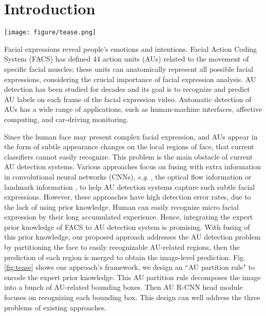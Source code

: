 \documentclass[5p,twocolumn]{elsarticle}
\newcommand{\eg}{\textit{e}.\textit{g}. }
\begin{document}
\section{Introduction}
\begin{figure*}[htbp]
	\texttt{[image: figure/tease.png]}
	\caption{The overall of AU R-CNN framework. It recognizes each RoI-level's label based on the AU partition rule, which uses the landmark point location information to encode the expert prior knowledge. This rule indicates the place where the AUs may occur. AU R-CNN head module focuses on recognizing each bounding box to improve performance.}
	\label{fig:tease}
\end{figure*}
Facial expressions reveal people's emotions and intentions. Facial Action Coding System (FACS) \cite{ekman1977facial} has defined 44 action units (AUs) related to the movement of specific facial muscles; these units can anatomically represent all possible facial expressions, considering the crucial importance of facial expression analysis. AU detection has been studied for decades and its goal is to recognize and predict AU labels on each frame of the facial expression video. Automatic detection of AUs has a wide range of applications, such as human-machine interfaces, affective computing, and car-driving monitoring.

Since the human face may present complex facial expression, and AUs appear in the form of subtle appearance changes on the local regions of face, that current classifiers cannot easily recognize. This problem is the main obstacle of current AU detection systems. 
Various approaches focus on fusing with extra information in convolutional neural networks (CNNs), \eg, the optical flow information \cite{romero2017multi} or landmark information \cite{li2017action,li2017eac}, to help AU detection systems capture such subtle facial expressions. However, these approaches have high detection error rates, due to the lack of using prior knowledge. Human can easily recognize micro facial expression by their long accumulated experience. Hence, integrating the expert prior knowledge of FACS \cite{ekman1977facial} to AU detection system is promising. With fusing of this prior knowledge, our proposed approach addresses the AU detection problem by partitioning the face to easily recognizable AU-related regions, then the prediction of each region is merged to obtain the image-level prediction. Fig. \ref{fig:tease} shows our approach's framework, we design an ``AU partition rule" to encode the expert prior knowledge. This AU partition rule decomposes the image into a bunch of AU-related bounding boxes. Then AU R-CNN head module focuses on recognizing each bounding box. This design can well address the three problems of existing approaches.
\end{document}
